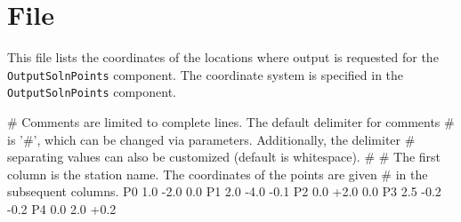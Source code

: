 \section{ File}
\label{sec:format:PointsList}

This file lists the coordinates of the locations where output is requested
for the \texttt{OutputSolnPoints} component. The coordinate system
is specified in the \texttt{OutputSolnPoints} component. 
\begin{PointsList}
# Comments are limited to complete lines. The default delimiter for comments
# is '#', which can be changed via parameters. Additionally, the delimiter 
# separating values can also be customized (default is whitespace).
#
# The first column is the station name. The coordinates of the points are given
# in the subsequent columns.
P0  1.0  -2.0   0.0
P1  2.0  -4.0  -0.1
P2  0.0  +2.0   0.0
P3  2.5  -0.2  -0.2 
P4  0.0   2.0  +0.2
\end{PointsList}

